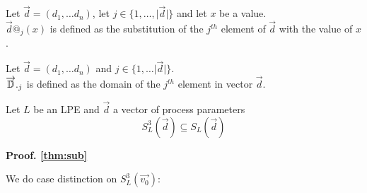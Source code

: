 \index{}\documentclass[a4paper,10pt]{article}
\theoremstyle{plain}
\theoremstyle{definition}
\newcommand{\ovr}{\overrightarrow}
\newcommand{\pps}{process parameters}
\newcommand{\tb}{\textbf}
\begin{document}
\begin{defn}[$@$] Let $\ovr{d} = (d_1, \dots d_n)$, let $j \in \lbrace 1, \ldots , \vert \ovr{d} \vert \rbrace$ and let $x$ be a value.\\
$\ovr{d}@_j(x)$ is defined as the substitution of the $j^{th}$ element of $\ovr{d}$ with the value of $x$.
\end{defn}

\begin{defn}[$\ovr{\Bbb{D}}$] Let $\ovr{d} = (d_1, \dots d_n)$ and $j \in \lbrace 1, \ldots \vert \ovr{d} \vert \rbrace$.\\
$\ovr{\Bbb{D}}._j$ is defined as the domain of the $j^{th}$ element in vector $\ovr{d}$.
\end{defn}

\begin{thm} Let $L$ be an LPE and $\ovr{d}$ a vector of \pps \label{thm:sub}
$$S_L^3(\ovr{d}) \subseteq S_L(\ovr{d}) $$
\end{thm} 
\begin{flushleft}

\tb{Proof. \ref{thm:sub}}
\end{flushleft}
We do case distinction on $S_L^3(\ovr{v_0})$:\\
\end{document}
